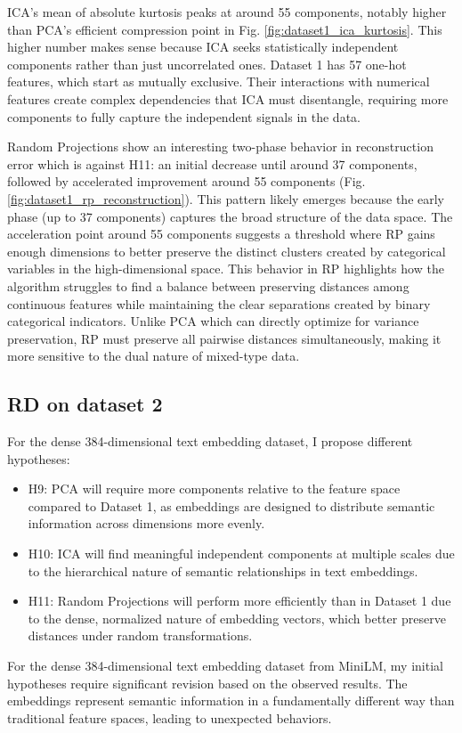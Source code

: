 \documentclass[conference]{IEEEtran}
\begin{document}
ICA's mean of absolute kurtosis peaks at around 55 components, notably higher than PCA's efficient compression point in Fig. \ref{fig:dataset1_ica_kurtosis}. This higher number makes sense because ICA seeks statistically independent components rather than just uncorrelated ones. Dataset 1 has 57 one-hot features, which start as mutually exclusive. Their interactions with numerical features create complex dependencies that ICA must disentangle, requiring more components to fully capture the independent signals in the data.

Random Projections show an interesting two-phase behavior in reconstruction error which is against H11: an initial decrease until around 37 components, followed by accelerated improvement around 55 components (Fig. \ref{fig:dataset1_rp_reconstruction}). This pattern likely emerges because the early phase (up to 37 components) captures the broad structure of the data space.
The acceleration point around 55 components suggests a threshold where RP gains enough dimensions to better preserve the distinct clusters created by categorical variables in the high-dimensional space.
This behavior in RP highlights how the algorithm struggles to find a balance between preserving distances among continuous features while maintaining the clear separations created by binary categorical indicators. Unlike PCA which can directly optimize for variance preservation, RP must preserve all pairwise distances simultaneously, making it more sensitive to the dual nature of mixed-type data.
\subsection{RD on dataset 2}
For the dense 384-dimensional text embedding dataset, I propose different hypotheses:
\begin{itemize}
    \item H9: PCA will require more components relative to the feature space compared to Dataset 1, as embeddings are designed to distribute semantic information across dimensions more evenly.
    \item H10: ICA will find meaningful independent components at multiple scales due to the hierarchical nature of semantic relationships in text embeddings.
    \item H11: Random Projections will perform more efficiently than in Dataset 1 due to the dense, normalized nature of embedding vectors, which better preserve distances under random transformations.
\end{itemize}
For the dense 384-dimensional text embedding dataset from MiniLM, my initial hypotheses require significant revision based on the observed results. The embeddings represent semantic information in a fundamentally different way than traditional feature spaces, leading to unexpected behaviors.
\end{document}
